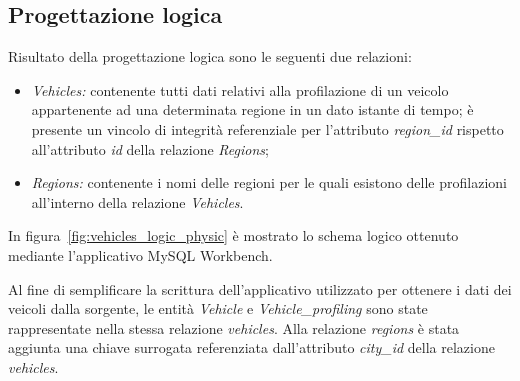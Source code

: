 \subsection{Progettazione logica}

Risultato della progettazione logica sono le seguenti due relazioni:
\begin{itemize}
\item \textit{Vehicles:} contenente tutti dati relativi alla profilazione di un veicolo
appartenente ad una determinata regione in un dato istante di tempo; è presente un
vincolo di integrità referenziale per l'attributo \textit{region\_id} rispetto
all'attributo \textit{id} della relazione \textit{Regions};
\item \textit{Regions:} contenente i nomi delle regioni per le quali esistono delle
profilazioni all'interno della relazione \textit{Vehicles}.
\end{itemize}
In figura~\ref{fig:vehicles_logic_physic} è mostrato lo schema logico ottenuto mediante
l'applicativo MySQL Workbench.

Al fine di semplificare la scrittura dell'applicativo utilizzato per ottenere i dati
dei veicoli dalla sorgente, le entità \textit{Vehicle} e \textit{Vehicle\_profiling} 
sono state rappresentate nella stessa relazione \textit{vehicles}.
Alla relazione \textit{regions} è stata aggiunta una chiave surrogata referenziata
dall'attributo \textit{city\_id} della relazione \textit{vehicles}.

